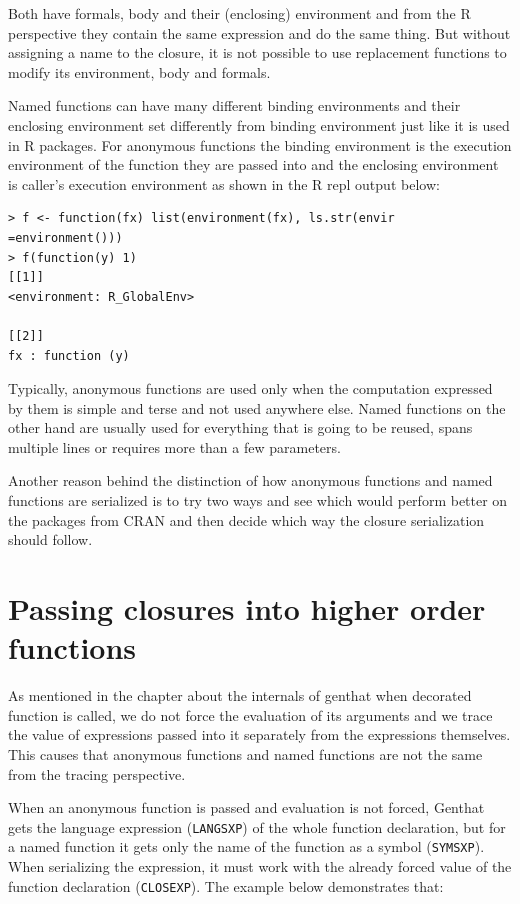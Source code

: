 \documentclass[thesis=B,english]{FITthesis}[2012/10/20]
\begin{document}
Both have formals, body and their (enclosing) environment and from the R perspective they contain the same expression and do the same thing. But without assigning a name to the closure, it is not possible to use replacement functions to modify its environment, body and formals. 

Named functions can have many different binding environments and their enclosing environment set differently from binding environment just like it is used in R packages. For anonymous functions the binding environment is the execution environment of the function they are passed into and the enclosing environment is caller’s execution environment as shown in the R repl output below:

\begin{verbatim}
> f <- function(fx) list(environment(fx), ls.str(envir =environment()))
> f(function(y) 1)
[[1]]
<environment: R_GlobalEnv>

[[2]]
fx : function (y)
\end{verbatim}

Typically, anonymous functions are used only when the computation expressed by them is simple and terse and not used anywhere else. Named functions on the other hand are usually used for everything that is going to be reused, spans multiple lines or requires more than a few parameters. 

Another reason behind the distinction of how anonymous functions and named functions are serialized is to try two ways and see which would perform better on the packages from CRAN and then decide which way the closure serialization should follow.

\section{Passing closures into higher order functions}
As mentioned in the chapter about the internals of genthat when decorated function is called, we do not force the evaluation of its arguments and we trace the value of expressions passed into it separately from the expressions themselves. This causes that anonymous functions and named functions are not the same from the tracing perspective. 

When an anonymous function is passed and evaluation is not forced, Genthat gets the language expression (\verb|LANGSXP|) of the whole function declaration, but for a named function it gets only the name of the function as a symbol (\verb|SYMSXP|). When serializing the expression, it must work with the already forced value of the function declaration (\verb|CLOSEXP|). The example below demonstrates that:
\end{document}
